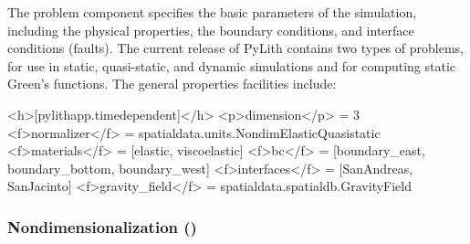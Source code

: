 The problem component specifies the basic parameters of the simulation,
including the physical properties, the boundary conditions, and interface
conditions (faults). The current release of PyLith contains two types
of problems,  for use in static, quasi-static,
and dynamic simulations and  for computing static
Green's functions. The general properties facilities include:
\begin{inventory}
\end{inventory}

\begin{cfg}
<h>[pylithapp.timedependent]</h>
<p>dimension</p> = 3
<f>normalizer</f> = spatialdata.units.NondimElasticQuasistatic
<f>materials</f> = [elastic, viscoelastic]
<f>bc</f> = [boundary_east, boundary_bottom, boundary_west]
<f>interfaces</f> = [SanAndreas, SanJacinto]
<f>gravity_field</f> = spatialdata.spatialdb.GravityField
\end{cfg}

\subsubsection{Nondimensionalization ()}

